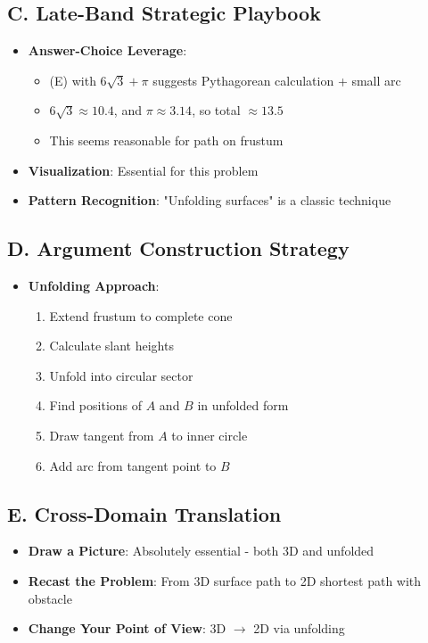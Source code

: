 \documentclass[12pt]{article}
\begin{document}
\begin{strategicbox}
\subsection*{C. Late-Band Strategic Playbook}
\begin{itemize}[leftmargin=*]
    \item \textbf{Answer-Choice Leverage}: 
    \begin{itemize}
        \item (E) with $6\sqrt{3} + \pi$ suggests Pythagorean calculation + small arc
        \item $6\sqrt{3} \approx 10.4$, and $\pi \approx 3.14$, so total $\approx 13.5$
        \item This seems reasonable for path on frustum
    \end{itemize}
    \item \textbf{Visualization}: Essential for this problem
    \item \textbf{Pattern Recognition}: "Unfolding surfaces" is a classic technique
\end{itemize}

\subsection*{D. Argument Construction Strategy}
\begin{itemize}[leftmargin=*]
    \item \textbf{Unfolding Approach}: 
    \begin{enumerate}
        \item Extend frustum to complete cone
        \item Calculate slant heights
        \item Unfold into circular sector
        \item Find positions of $A$ and $B$ in unfolded form
        \item Draw tangent from $A$ to inner circle
        \item Add arc from tangent point to $B$
    \end{enumerate}
\end{itemize}

\subsection*{E. Cross-Domain Translation}
\begin{itemize}[leftmargin=*]
    \item \textbf{Draw a Picture}: Absolutely essential - both 3D and unfolded
    \item \textbf{Recast the Problem}: From 3D surface path to 2D shortest path with obstacle
    \item \textbf{Change Your Point of View}: 3D $\to$ 2D via unfolding
\end{itemize}
\end{strategicbox}
\end{document}
